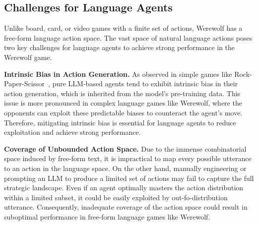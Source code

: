 \subsection{Challenges for Language Agents}

Unlike board, card, or video games with a finite set of actions, Werewolf has a free-form language action space. The vast space of natural language actions poses two key challenges for language agents to achieve strong performance in the Werewolf game.

\textbf{Intrinsic Bias in Action Generation.}
As observed in simple games like Rock-Paper-Scissor~\cite{xu2023language}, pure LLM-based agents tend to exhibit intrinsic bias in their action generation, which is inherited from the model's pre-training data. 
This issue is more pronounced in complex language games like Werewolf, where the opponents can exploit these predictable biases to counteract the agent's move. Therefore, mitigating intrinsic bias is essential for language agents to reduce exploitation and achieve strong performance.

\textbf{Coverage of Unbounded Action Space.}
Due to the immense combinatorial space induced by free-form text, it is impractical to map every possible utterance to an action in the language space. On the other hand, manually engineering or prompting an LLM to produce a limited set of actions may fail to capture the full strategic landscape. Even if an agent optimally masters the action distribution within a limited subset, it could be easily exploited by out-fo-distribution utterance. Consequently, inadequate coverage of the action space could result in suboptimal performance in free-form language games like Werewolf.

